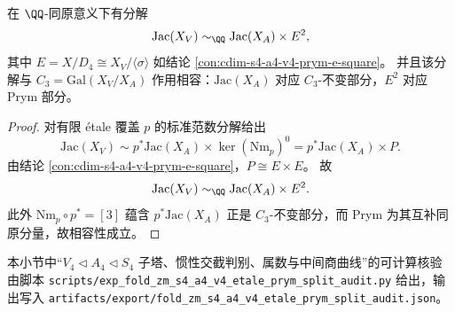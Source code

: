 \begin{conclusion}\label{con:cdim-s4-a4-v4-jacobian-splitting}
在 \(\QQ\)-同原意义下有分解
\[
\mathrm{Jac}(X_V)\sim_{\QQ}\mathrm{Jac}(X_A)\times E^2,
\]
其中 \(E=X/D_4\cong X_V/\langle\sigma\rangle\) 如结论 \ref{con:cdim-s4-a4-v4-prym-e-square}。
并且该分解与 \(C_3=\mathrm{Gal}(X_V/X_A)\) 作用相容：\(\mathrm{Jac}(X_A)\) 对应 \(C_3\)-不变部分，\(E^2\) 对应 Prym 部分。
\end{conclusion}
\begin{proof}
对有限 étale 覆盖 \(p\) 的标准范数分解给出
\[
\mathrm{Jac}(X_V)\sim p^*\mathrm{Jac}(X_A)\times \ker(\mathrm{Nm}_p)^0
=p^*\mathrm{Jac}(X_A)\times P.
\]
由结论 \ref{con:cdim-s4-a4-v4-prym-e-square}，\(P\cong E\times E\)。
故
\[
\mathrm{Jac}(X_V)\sim_{\QQ}\mathrm{Jac}(X_A)\times E^2.
\]
此外 \(\mathrm{Nm}_p\circ p^*=[3]\) 蕴含 \(p^*\mathrm{Jac}(X_A)\) 正是 \(C_3\)-不变部分，而 Prym 为其互补同原分量，故相容性成立。
\end{proof}

\begin{remark}[群论与属数审计输出]\label{rem:cdim-s4-a4-v4-etale-prym-audit}
本小节中“\(V_4\lhd A_4\lhd S_4\) 子塔、惯性交截判别、属数与中间商曲线”的可计算核验由脚本
\texttt{scripts/exp\_fold\_zm\_s4\_a4\_v4\_etale\_prym\_split\_audit.py}
给出，输出写入
\texttt{artifacts/export/fold\_zm\_s4\_a4\_v4\_etale\_prym\_split\_audit.json}。
\end{remark}

